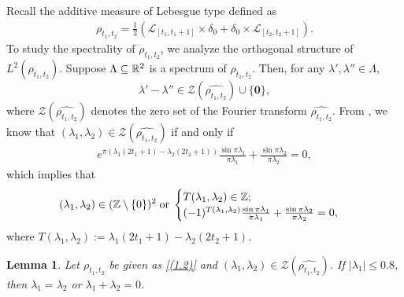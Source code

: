 \documentclass[12pt,psfig,reqno]{amsart}
\numberwithin{equation}{section}
\theoremstyle{plain}
\newtheorem{lem}[thm]{Lemma}
\begin{document}
Recall the additive measure of Lebesgue type defined as 
\begin{align*}
	\rho_{t_1,t_2}=\frac{1}{2}(\mathcal{L}_{[t_1,t_1+1]}\times\delta_0+\delta_0\times\mathcal{L}_{[t_2,t_2+1]}).
\end{align*}
To study the spectrality of $\rho_{t_1,t_2}$, we analyze the orthogonal structure of $L^2(\rho_{t_1,t_2})$.
Suppose $\Lambda\subseteq \Bbb R^2$ is a spectrum of $\rho_{t_1,t_2}$. Then, for any $\lambda',\lambda''\in \Lambda$, 
$$
\lambda'-\lambda''\in\mathcal{Z}(\widehat{\rho_{t_1,t_2}})\cup\{\textbf{0}\}, 
$$
where $\mathcal{Z}(\widehat{\rho_{t_1,t_2}})$ denotes the zero set of the Fourier transform  $\widehat{\rho_{t_1,t_2}}$.
From \cite{LLP21}, we know that $(\lambda_1,\lambda_2)\in\mathcal{Z}(\widehat{\rho_{t_1,t_2}})$ if and only if   
\begin{align*}
	e^{\pi(\lambda_1(2t_1+1)-\lambda_2(2t_2+1))}\frac{\sin\pi\lambda_1}{\pi\lambda_1}+\frac{\sin\pi\lambda_2}{\pi\lambda_2}=0,
\end{align*}
which implies that  
\begin{align}\label{(4.1)}
(\lambda_1,\lambda_2)\in(\Bbb Z\setminus\{0\})^2\;\text{or}\;\begin{cases}
		T(\lambda_1,\lambda_2)\in\Bbb Z;
		\\
		(-1)^{	T(\lambda_1,\lambda_2)}\frac{\sin\pi\lambda_1}{\pi\lambda_1}+\frac{\sin\pi\lambda_2}{\pi\lambda_2}=0,
	\end{cases}
\end{align}
where $T(\lambda_1,\lambda_2):=\lambda_1(2t_1+1)-\lambda_2(2t_2+1)$. 
\begin{lem}\label{thm4.1}
Let $\rho_{t_1,t_2}$ be given as \eqref{(1.2)} and  $(\lambda_1,\lambda_2)\in\mathcal{Z}(\widehat{\rho_{t_1,t_2}})$. 
If $|\lambda_1|\leq0.8$, then $\lambda_1=\lambda_2$ or $\lambda_1+\lambda_2=0$. 
\end{lem}
\end{document}
